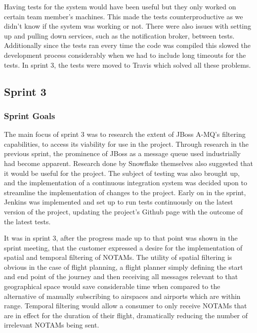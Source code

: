 \documentclass[a4paper, 12pt]{article}
\begin{document}
Having tests for the system would have been useful but they only worked on certain team member's machines. This made the tests counterproductive as we didn't know if the system was working or not. There were also issues with setting up and pulling down services, such as the notification broker, between tests. Additionally since the tests ran every time the code was compiled this slowed the development process considerably when we had to include long timeouts for the tests. In sprint 3, the tests were moved to Travis which solved all these problems.

\subsection{Sprint 3}

\subsubsection{Sprint Goals}

The main focus of sprint 3 was to research the extent of JBoss A-MQ's filtering capabilities, to access its viability for use in the project. Through research in the previous sprint, the prominence of JBoss as a message queue used industrially had become apparent. Research done by Snowflake themselves also suggested that it would be useful for the project. The subject of testing was also brought up, and the implementation of a continuous integration system was decided upon to streamline the implementation of changes to the project. Early on in the sprint, Jenkins was implemented and set up to run tests continuously on the latest version of the project, updating the project's Github page with the outcome of the latest tests.

It was in sprint 3, after the progress made up to that point was shown in the sprint meeting, that the customer expressed a desire for the implementation of spatial and temporal filtering of NOTAMs. The utility of spatial filtering is obvious in the case of flight planning, a flight planner simply defining the start and end point of the journey and then receiving all messages relevant to that geographical space would save considerable time when compared to the alternative of manually subscribing to airspaces and airports which are within range. Temporal filtering would allow a consumer to only receive NOTAMs that are in effect for the duration of their flight, dramatically reducing the number of irrelevant NOTAMs being sent.
\end{document}
